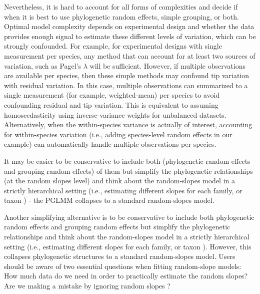 \documentclass[12pt]{article}
\begin{document}
Nevertheless, it is hard to account for all forms of complexities and decide if when it is best to use phylogenetic random effects, simple grouping, or both. 
Optimal model complexity depends on experimental design and whether the data provides enough signal to estimate these different levels of variation, which can be strongly confounded.
For example, for experimental designs with single measurement per species, any method that can account for at least two sources of variation, such as Pagel's $\lambda$ will be sufficient. 
However, if multiple observations are available per species, then these simple methods may confound tip variation with residual variation.
In this case, multiple observations can summarized to a single measurement (for example, weighted-mean) per species to avoid confounding residual and tip variation.
This is equivalent to assuming homoscedasticity using inverse-variance weights for unbalanced datasets. 
Alternatively, when the within-species variance is actually of interest, accounting for within-species variation (i.e., adding species-level random effects in our example) can automatically handle multiple observations per species.

It may be easier to be conservative to include both (phylogenetic random effects and grouping random effects) of them but simplify the phylogenetic relationships (at the random slopes level) and think about the random-slopes model in a strictly hierarchical setting (i.e., estimating different slopes for each family, or taxon \citep{bunnefeld2012island}) - the PGLMM collapses to a standard random-slopes model. 

Another simplifying alternative is to be conservative to include both phylogenetic random effects and grouping random effects but simplify the phylogenetic relationships and think about the random-slopes model in a strictly hierarchical setting (i.e., estimating different slopes for each family, or taxon \citep{bunnefeld2012island}). 
However, this collapses phylogenetic structures to a standard random-slopes model. 
Users should be aware of two essential questions when fitting random-slope models: How much data do we need in order to practically estimate the random slopes? Are we making a mistake by ignoring random slopes \citep{schielzeth2008conclusions}? 
\end{document}
